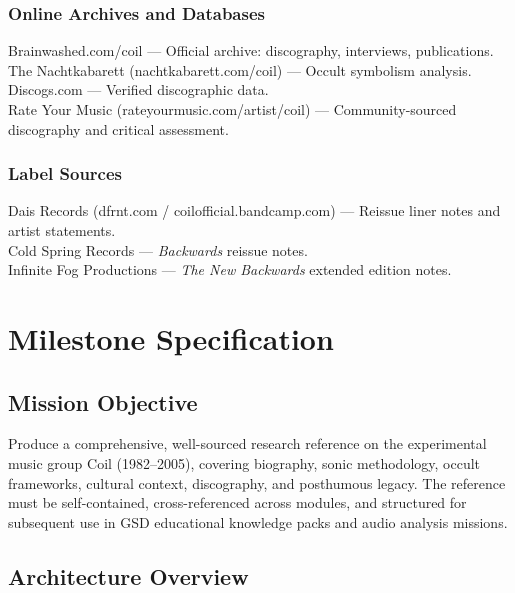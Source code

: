 \documentclass[11pt,letterpaper]{article}
\newcommand{\stageheader}[2]{%
  \noindent\colorbox{#2}{\makebox[\textwidth][l]{%
    \textcolor{white}{\bfseries\sffamily\hspace{6pt}#1\hspace{6pt}}}}%
  \vspace{0.5em}\par%
}
\begin{document}
\subsubsection{Online Archives and Databases}
Brainwashed.com/coil --- Official archive: discography, interviews, publications. \\
The Nachtkabarett (nachtkabarett.com/coil) --- Occult symbolism analysis. \\
Discogs.com --- Verified discographic data. \\
Rate Your Music (rateyourmusic.com/artist/coil) --- Community-sourced discography and critical assessment.

\subsubsection{Label Sources}
Dais Records (dfrnt.com / coilofficial.bandcamp.com) --- Reissue liner notes and artist statements. \\
Cold Spring Records --- \textit{Backwards} reissue notes. \\
Infinite Fog Productions --- \textit{The New Backwards} extended edition notes.

\newpage

\stageheader{STAGE 3 --- MISSION PACKAGE}{tertiary}

\section{Milestone Specification}

\subsection{Mission Objective}

Produce a comprehensive, well-sourced research reference on the experimental music group Coil (1982--2005), covering biography, sonic methodology, occult frameworks, cultural context, discography, and posthumous legacy. The reference must be self-contained, cross-referenced across modules, and structured for subsequent use in GSD educational knowledge packs and audio analysis missions.

\subsection{Architecture Overview}
\end{document}
